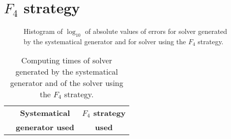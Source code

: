 \section{$F_4$ strategy}
\begin{figure}[ht]
  \centering
  \resizebox{0.95\textwidth}{!}{}
  \caption{Histogram of $\log_{10}$ of absolute values of errors for solver generated by the systematical generator and for solver using the $F_4$ strategy.}
  \label{graph:gen}
\end{figure}

\begin{table}[ht]
  \centering
  \begin{tabular}{|c||cc|}
    \hline
    & \textbf{Systematical}    & \textbf{$F_4$ strategy} \\
    &  \textbf{generator used} & \textbf{used} \\
    \hline\hline
    
    \hline
  \end{tabular}
  \caption{Computing times of solver generated by the systematical generator and of the solver using the $F_4$ strategy.}
  \label{tab:gen}
\end{table}
